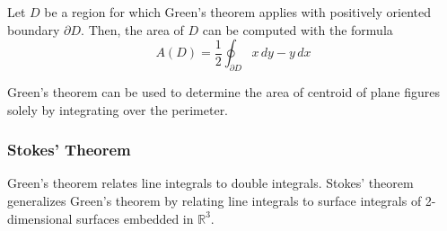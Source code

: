   \begin{corollary}
		Let $D$ be a region for which Green's theorem applies with positively oriented boundary $\partial D$. Then, the area of $D$ can be computed with the formula
		\begin{equation}
			A(D) = \frac{1}{2} \oint_{\partial D} x \, d y - y \, d x
		\end{equation}
  \end{corollary}

  Green's theorem can be used to determine the area of centroid of plane figures solely by integrating over the perimeter. 

\subsubsection{Stokes' Theorem}

  Green's theorem relates line integrals to double integrals. Stokes' theorem generalizes Green's theorem by relating line integrals to surface integrals of 2-dimensional surfaces embedded in $\mathbb{R}^3$. 

